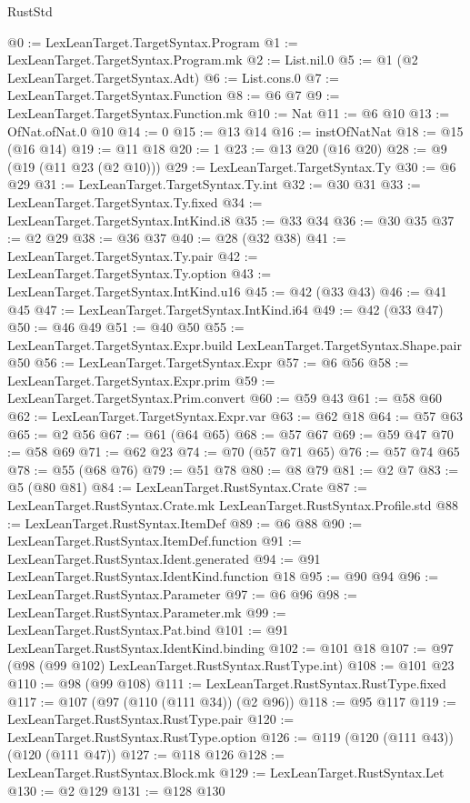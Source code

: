 \begin{lexlean}{RustStd}
\begin{coremodule}
@0 := LexLeanTarget.TargetSyntax.Program
@1 := LexLeanTarget.TargetSyntax.Program.mk
@2 := List.nil.{0}
@5 := @1 (@2 LexLeanTarget.TargetSyntax.Adt)
@6 := List.cons.{0}
@7 := LexLeanTarget.TargetSyntax.Function
@8 := @6 @7
@9 := LexLeanTarget.TargetSyntax.Function.mk
@10 := Nat
@11 := @6 @10
@13 := OfNat.ofNat.{0} @10
@14 := 0
@15 := @13 @14
@16 := instOfNatNat
@18 := @15 (@16 @14)
@19 := @11 @18
@20 := 1
@23 := @13 @20 (@16 @20)
@28 := @9 (@19 (@11 @23 (@2 @10)))
@29 := LexLeanTarget.TargetSyntax.Ty
@30 := @6 @29
@31 := LexLeanTarget.TargetSyntax.Ty.int
@32 := @30 @31
@33 := LexLeanTarget.TargetSyntax.Ty.fixed
@34 := LexLeanTarget.TargetSyntax.IntKind.i8
@35 := @33 @34
@36 := @30 @35
@37 := @2 @29
@38 := @36 @37
@40 := @28 (@32 @38)
@41 := LexLeanTarget.TargetSyntax.Ty.pair
@42 := LexLeanTarget.TargetSyntax.Ty.option
@43 := LexLeanTarget.TargetSyntax.IntKind.u16
@45 := @42 (@33 @43)
@46 := @41 @45
@47 := LexLeanTarget.TargetSyntax.IntKind.i64
@49 := @42 (@33 @47)
@50 := @46 @49
@51 := @40 @50
@55 := LexLeanTarget.TargetSyntax.Expr.build LexLeanTarget.TargetSyntax.Shape.pair @50
@56 := LexLeanTarget.TargetSyntax.Expr
@57 := @6 @56
@58 := LexLeanTarget.TargetSyntax.Expr.prim
@59 := LexLeanTarget.TargetSyntax.Prim.convert
@60 := @59 @43
@61 := @58 @60
@62 := LexLeanTarget.TargetSyntax.Expr.var
@63 := @62 @18
@64 := @57 @63
@65 := @2 @56
@67 := @61 (@64 @65)
@68 := @57 @67
@69 := @59 @47
@70 := @58 @69
@71 := @62 @23
@74 := @70 (@57 @71 @65)
@76 := @57 @74 @65
@78 := @55 (@68 @76)
@79 := @51 @78
@80 := @8 @79
@81 := @2 @7
@83 := @5 (@80 @81)
@84 := LexLeanTarget.RustSyntax.Crate
@87 := LexLeanTarget.RustSyntax.Crate.mk LexLeanTarget.RustSyntax.Profile.std
@88 := LexLeanTarget.RustSyntax.ItemDef
@89 := @6 @88
@90 := LexLeanTarget.RustSyntax.ItemDef.function
@91 := LexLeanTarget.RustSyntax.Ident.generated
@94 := @91 LexLeanTarget.RustSyntax.IdentKind.function @18
@95 := @90 @94
@96 := LexLeanTarget.RustSyntax.Parameter
@97 := @6 @96
@98 := LexLeanTarget.RustSyntax.Parameter.mk
@99 := LexLeanTarget.RustSyntax.Pat.bind
@101 := @91 LexLeanTarget.RustSyntax.IdentKind.binding
@102 := @101 @18
@107 := @97 (@98 (@99 @102) LexLeanTarget.RustSyntax.RustType.int)
@108 := @101 @23
@110 := @98 (@99 @108)
@111 := LexLeanTarget.RustSyntax.RustType.fixed
@117 := @107 (@97 (@110 (@111 @34)) (@2 @96))
@118 := @95 @117
@119 := LexLeanTarget.RustSyntax.RustType.pair
@120 := LexLeanTarget.RustSyntax.RustType.option
@126 := @119 (@120 (@111 @43)) (@120 (@111 @47))
@127 := @118 @126
@128 := LexLeanTarget.RustSyntax.Block.mk
@129 := LexLeanTarget.RustSyntax.Let
@130 := @2 @129
@131 := @128 @130

\end{coremodule}
\end{lexlean}
